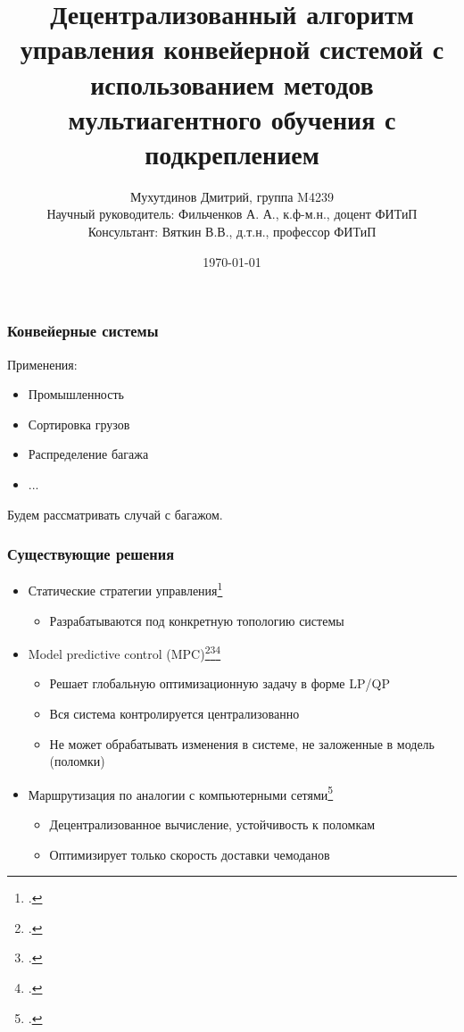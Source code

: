 \documentclass{beamer}
\title[DQN-routing]{
  Децентрализованный алгоритм управления конвейерной системой
  с использованием методов мультиагентного обучения с подкреплением
}
\author[Дмитрий Мухутдинов, М4239]{
  Мухутдинов Дмитрий, группа M4239 \\
  Научный руководитель: Фильченков А. А., к.ф-м.н., доцент ФИТиП \\
  Консультант: Вяткин В.В., д.т.н., профессор ФИТиП
}%
\institute[ИТМО] %
{
  Факультет Информационных Технологий и Программирования \\
  Мегафакультет Трансляционных Информационных Технологий \\
  Университет ИТМО, Санкт-Петербург
}
\date{\today} %
\begin{document}
\frame{\titlepage}


\begin{frame}
  \frametitle{Конвейерные системы}
  Применения:
  \begin{itemize}
  \item Промышленность
  \item Сортировка грузов
  \item Распределение багажа
  \item ...
  \end{itemize}
  Будем рассматривать случай с багажом.
\end{frame}


\begin{frame}
  \frametitle{Существующие решения}
  \begin{itemize}
  \item Статические стратегии управления\footcite{de1994baggage}
    \begin{itemize}
    \item Разрабатываются под конкретную топологию системы
    \end{itemize}
  \item Model predictive control (MPC)\footcite{cataldo2016dynamic}\footcite{zeinaly2015integrated}\footcite{luo2015energy}
    \begin{itemize}
    \item Решает глобальную оптимизационную задачу в форме LP/QP
    \item Вся система контролируется централизованно
    \item Не может обрабатывать изменения в системе, не заложенные в модель (поломки)
    \end{itemize}
  \item Маршрутизация по аналогии с компьютерными сетями\footcite{vyatkin-controllers}
    \begin{itemize}
    \item Децентрализованное вычисление, устойчивость к поломкам
    \item Оптимизирует только скорость доставки чемоданов
    \end{itemize}
  \end{itemize}
\end{frame}
\end{document}
